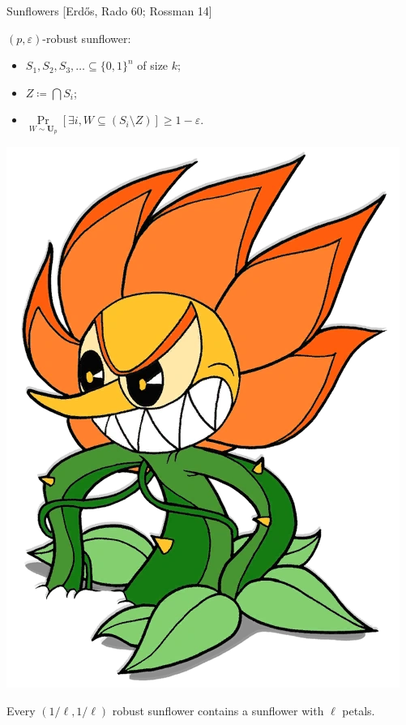\begin{frame}{Sunflowers [Erd\H{o}s, Rado 60; Rossman 14]}
    \begin{minipage}{0.55\linewidth}
        $(p, \varepsilon)$-robust sunflower:
        \begin{itemize}
            \item $S_1, S_2, S_3, \dots \subseteq \{0, 1\}^n$ of size $k$;
            \item $Z \coloneqq \bigcap S_i$;
            \item $\Pr\limits_{W \sim \mathbf{U}_p}[\exists i, W \subseteq (S_i \setminus Z)] \ge 1 -
                \varepsilon$.
        \end{itemize}
    \end{minipage}
    \begin{minipage}{0.4\linewidth}
        \centering
        \pause
        \includegraphics[scale = 0.1]{pics/cagney2.png}
    \end{minipage}

    \pause
    \begin{block}{}
        Every $\left( 1 / \ell, 1 / \ell\right)$ robust sunflower contains a sunflower with
        $\ell$ petals.
    \end{block}
\end{frame}


